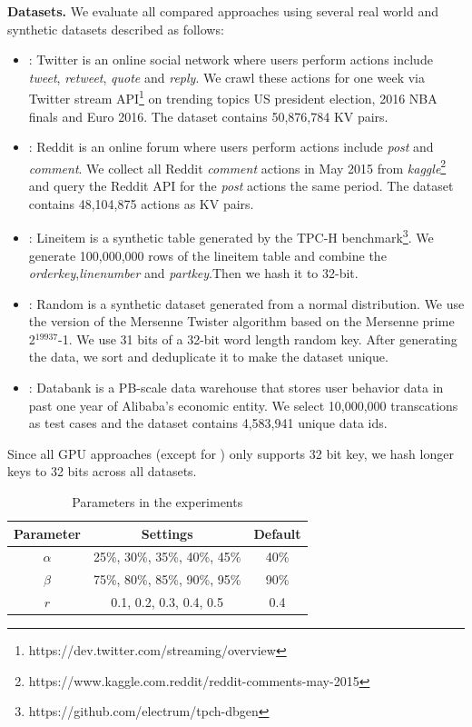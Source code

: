 \vspace{1mm}\noindent\textbf{Datasets.} We evaluate all compared approaches using several real world and synthetic datasets described as follows:
\begin{itemize}
	\item \dstwitter: Twitter is an online social network where users perform actions include \emph{tweet}, \emph{retweet}, \emph{quote} and \emph{reply}.
	We crawl these actions for one week via Twitter stream API\footnote{https://dev.twitter.com/streaming/overview} on trending topics US president election, 2016 NBA finals and Euro 2016. The dataset contains 50,876,784 KV pairs.
	\item \dsreddit: Reddit is an online forum where users perform actions include \emph{post} and \emph{comment}. We collect all Reddit \emph{comment} actions in May 2015 from \emph{kaggle}\footnote{https://www.kaggle.com.reddit/reddit-comments-may-2015} and query the Reddit API for the \emph{post} actions the same period. The dataset contains 48,104,875 actions as KV pairs. 
 	\item \dstpch: Lineitem is a synthetic table generated by the TPC-H benchmark\footnote{https://github.com/electrum/tpch-dbgen}. We generate  100,000,000 rows of the lineitem table and combine the \emph{orderkey},\emph{linenumber} and \emph{partkey}.Then we hash it to 32-bit.
	\item \dsrandom: Random is a synthetic dataset generated from a normal distribution. We use the version of the Mersenne Twister algorithm based on the Mersenne prime 2$^{19937}$-1. We use 31 bits of a 32-bit word length random key. After generating the data, we sort and deduplicate it to make the dataset unique. 
	\item \dsali: Databank is a PB-scale data warehouse that stores user behavior data in past one year of Alibaba's economic entity. We select  10,000,000 transcations as test cases and the dataset contains 4,583,941 unique data ids.
\end{itemize}
Since all GPU approaches (except for \voter) only supports 32 bit key, we hash longer keys to 32 bits across all datasets. 


\begin{table}
	\centering
	\caption{Parameters in the experiments}
	\label{tbl:parameters}
	\begin{tabular}{|c|c|c|}
		\hline
		\textbf{Parameter} & \textbf{Settings} & \textbf{Default} \\ \hline
		$\alpha$ & 25\%, 30\%, 35\%, 40\%, 45\% & 40\% \\ \hline
		$\beta$  & 75\%, 80\%, 85\%, 90\%, 95\% & 90\% \\ \hline
		$r$ & 0.1, 0.2, 0.3, 0.4, 0.5 & 0.4 \\ \hline
	\end{tabular}
\end{table}

